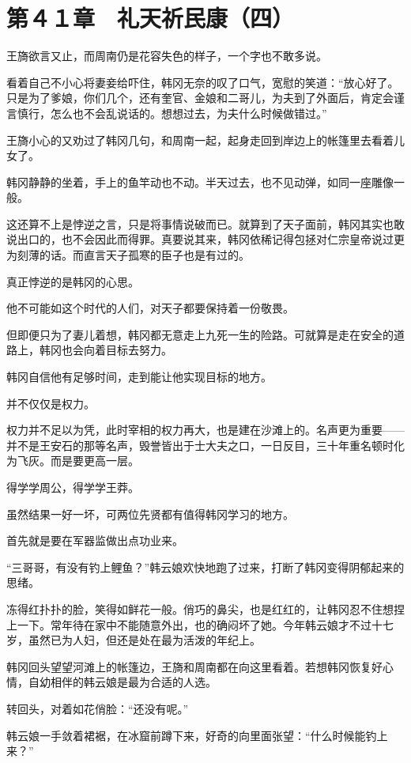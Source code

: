 \section{第４１章　礼天祈民康（四）}

王旖欲言又止，而周南仍是花容失色的样子，一个字也不敢多说。

看着自己不小心将妻妾给吓住，韩冈无奈的叹了口气，宽慰的笑道：“放心好了。只是为了爹娘，你们几个，还有奎官、金娘和二哥儿，为夫到了外面后，肯定会谨言慎行，怎么也不会乱说话的。想想过去，为夫什么时候做错过。”

王旖小心的又劝过了韩冈几句，和周南一起，起身走回到岸边上的帐篷里去看着儿女了。

韩冈静静的坐着，手上的鱼竿动也不动。半天过去，也不见动弹，如同一座雕像一般。

这还算不上是悖逆之言，只是将事情说破而已。就算到了天子面前，韩冈其实也敢说出口的，也不会因此而得罪。真要说其来，韩冈依稀记得包拯对仁宗皇帝说过更为刻薄的话。而直言天子孤寒的臣子也是有过的。

真正悖逆的是韩冈的心思。

他不可能如这个时代的人们，对天子都要保持着一份敬畏。

但即便只为了妻儿着想，韩冈都无意走上九死一生的险路。可就算是走在安全的道路上，韩冈也会向着目标去努力。

韩冈自信他有足够时间，走到能让他实现目标的地方。

并不仅仅是权力。

权力并不足以为凭，此时宰相的权力再大，也是建在沙滩上的。名声更为重要——并不是王安石的那等名声，毁誉皆出于士大夫之口，一日反目，三十年重名顿时化为飞灰。而是要更高一层。

得学学周公，得学学王莽。

虽然结果一好一坏，可两位先贤都有值得韩冈学习的地方。

首先就是要在军器监做出点功业来。

“三哥哥，有没有钓上鲤鱼？”韩云娘欢快地跑了过来，打断了韩冈变得阴郁起来的思绪。

冻得红扑扑的脸，笑得如鲜花一般。俏巧的鼻尖，也是红红的，让韩冈忍不住想捏上一下。常年待在家中不能随意外出，也的确闷坏了她。今年韩云娘才不过十七岁，虽然已为人妇，但还是处在最为活泼的年纪上。

韩冈回头望望河滩上的帐篷边，王旖和周南都在向这里看着。若想韩冈恢复好心情，自幼相伴的韩云娘是最为合适的人选。

转回头，对着如花俏脸：“还没有呢。”

韩云娘一手敛着裙裾，在冰窟前蹲下来，好奇的向里面张望：“什么时候能钓上来？”

